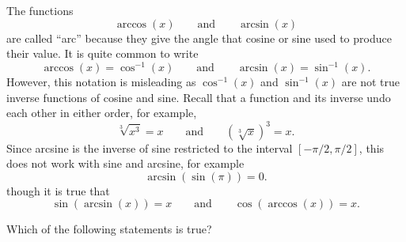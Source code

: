 \documentclass{ximera}
\begin{document}
The functions
\[
\arccos(x)\qquad\text{and}\qquad\arcsin(x)
\]
are called ``arc'' because they give the angle that cosine or sine
used to produce their value.  It is quite common to write
\[
\arccos(x) = \cos^{-1}(x)\qquad\text{and}\qquad\arcsin(x) = \sin^{-1}(x).
\]
However, this notation is misleading as $\cos^{-1}(x)$ and
$\sin^{-1}(x)$ are not true inverse functions of cosine and sine.
Recall that a function and its inverse undo each other in either
order, for example,
\[
\sqrt[3]{x^3}=x\qquad \text{and}\qquad \left(\sqrt[3]{x}\right)^3=x. 
\]
Since arcsine is the inverse of sine restricted to the interval
$[-\pi/2,\pi/2]$, this does not work with sine and arcsine, for
example
\[
\arcsin(\sin(\pi))=0.
\]
though it is true that
\[
\sin(\arcsin(x)) = x\qquad\text{and}\qquad\cos(\arccos(x)) = x.
\]
\begin{question}
   Which of the following statements is true?
   \begin{multipleChoice}
   \end{multipleChoice}  
\end{question}
\end{document}
